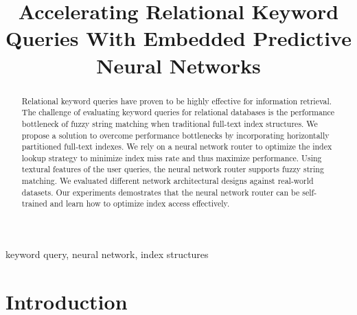 \documentclass[conference]{IEEEtran}
\begin{document}
\title{
Accelerating Relational Keyword Queries With Embedded Predictive Neural Networks
}

\author{
\and
{}
\and
{}
}

\maketitle

\begin{abstract}
Relational keyword queries have proven to be highly effective for
information retrieval.  The challenge of evaluating keyword queries for
relational databases is the performance bottleneck of fuzzy string
matching when traditional full-text index structures.  We propose a
solution to overcome performance bottlenecks by incorporating
horizontally partitioned full-text indexes.  We rely on a neural
network router to optimize the index lookup strategy to minimize index
miss rate and thus maximize performance.  Using textural features of
the user queries, the neural network router supports fuzzy string
matching.  We evaluated different network architectural designs against
real-world datasets.  Our experiments demostrates that the neural
network router can be self-trained and learn how to optimize index
access effectively.
\end{abstract}

\begin{IEEEkeywords}
keyword query, neural network, index structures
\end{IEEEkeywords}

\section{Introduction}
\end{document}
